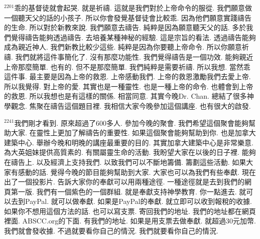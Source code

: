 \documentclass{book}
\begin{document}
$^{2201}$乖的基督徒就會起哭.
就是祈禱.
這就是我們對於上帝命令的服從.
我們願意做一個聽天父的話的小孩子.
所以你會發覺基督徒會比較乖.
因為他們願意實踐禱告的生命.
所以對於新教來說.
我們願意去禱告.
純粹是因為願意聽天父的話.
多於我們覺得禱告能夠透過禱告.
去培養某種神秘的經驗.
這是宗旨的看法.
透過禱告能夠成為親近神人.
我們新教比較少這些.
純粹是因為你要聽上帝命令.
所以你願意祈禱.
我們就將這件事簡化了.
沒有那麼功能性.
我們覺得禱告是一個功效.
能夠親近上帝那麼簡單.
也有的.
但不是那麼簡單.
我們純粹是需要祈禱.
所以我想.
當然乖這件事.
最主要是因為上帝的救恩.
上帝感動我們.
上帝的救恩激勵我們去愛上帝.
所以我覺得.
對上帝的愛.
其實也是一種靈性.
也是一種上帝的命令.
也體會到上帝的救恩.
所以我想也是有這樣的關係.
相當同意.
其實今晚Dr. Chan.
總結了很多神學觀念.
焦聚在禱告這個題目裡.
我相信大家今晚參加這個講座.
也有很大的啟發.

$^{2241}$我們剛才看到.
原來超過了600多人.
參加今晚的聚會.
我們希望這個聚會能夠幫助大家.
在靈性上更加了解禱告的重要性.
如果這個聚會能夠幫助到你.
也是加拿大建築中心.
舉辦今晚和明晚的講座最重要的目的.
其實加拿大建築中心是非常樂意.
為大英姐妹提供高質素的.
有關屬靈生命的活動.
我盼望大家在以後的日子裡.
能夠在禱告上.
以及經濟上支持我們.
以致我們可以不斷地籌備.
籌劃這些活動.
如果大家有感動的話.
覺得今晚的節目能夠幫助到大家.
大家也可以為我們有些奉獻.
現在出了一個投影片.
告訴大家你的奉獻可以用兩種途徑.
一種途徑就是去到我們的網頁第一版.
我們有一個紫色的一個群組.
就是奉獻支持神學教育.
你一點進去.
就可以去到PayPal.
就可以做奉獻.
如果是PayPal的奉獻.
就立即可以收到報稅的收據.
如果你不想用這個方法的話.
也可以寫支票.
寄回我們的地址.
我們的地址都在網頁裡面.
ABSCC.org的下面.
有我們的地址.
如果是用支票去做奉獻.
就超過30元加幣.
我們就會發收據.
不過就要看你自己的情況.
我們就要看你自己的情況.

\newpage
\end{document}
